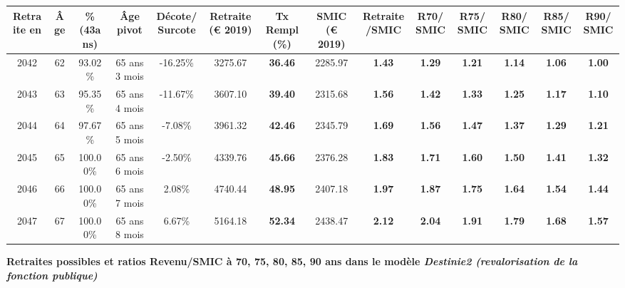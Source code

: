 \begin{adjustbox}{max width=\textwidth} 
\begin{tabular}[htb]{|c|c||c|c|c||c|c||c|c||c|c|c|c|c|} 
\hline 
 Retraite en &  Âge &  \%(43ans) &  Âge pivot &  Décote/Surcote &  Retraite (\euro{} 2019) &  Tx Rempl(\%) &  SMIC (\euro{} 2019) &  Retraite/SMIC &  R70/SMIC &  R75/SMIC &  R80/SMIC &  R85/SMIC &  R90/SMIC \\ 
\hline \hline 
 2042 &  62 &  93.02\% &  65 ans 3 mois &  -16.25\% &  3275.67 &  {\bf 36.46} &  2285.97 &  {\bf 1.43} &  {\bf 1.29} &  {\bf 1.21} &  {\bf 1.14} &  {\bf 1.06} &  {\bf {\color{red} 1.00}} \\ 
\hline 
 2043 &  63 &  95.35\% &  65 ans 4 mois &  -11.67\% &  3607.10 &  {\bf 39.40} &  2315.68 &  {\bf 1.56} &  {\bf 1.42} &  {\bf 1.33} &  {\bf 1.25} &  {\bf 1.17} &  {\bf 1.10} \\ 
\hline 
 2044 &  64 &  97.67\% &  65 ans 5 mois &  -7.08\% &  3961.32 &  {\bf 42.46} &  2345.79 &  {\bf 1.69} &  {\bf 1.56} &  {\bf 1.47} &  {\bf 1.37} &  {\bf 1.29} &  {\bf 1.21} \\ 
\hline 
 2045 &  65 &  100.00\% &  65 ans 6 mois &  -2.50\% &  4339.76 &  {\bf 45.66} &  2376.28 &  {\bf 1.83} &  {\bf 1.71} &  {\bf 1.60} &  {\bf 1.50} &  {\bf 1.41} &  {\bf 1.32} \\ 
\hline 
 2046 &  66 &  100.00\% &  65 ans 7 mois &  2.08\% &  4740.44 &  {\bf 48.95} &  2407.18 &  {\bf 1.97} &  {\bf 1.87} &  {\bf 1.75} &  {\bf 1.64} &  {\bf 1.54} &  {\bf 1.44} \\ 
\hline 
 2047 &  67 &  100.00\% &  65 ans 8 mois &  6.67\% &  5164.18 &  {\bf 52.34} &  2438.47 &  {\bf 2.12} &  {\bf 2.04} &  {\bf 1.91} &  {\bf 1.79} &  {\bf 1.68} &  {\bf 1.57} \\ 
\hline 
\hline 
\end{tabular} 
\end{adjustbox} 
 
 \vspace{0.1cm} 
{\bf \noindent Retraites possibles et ratios Revenu/SMIC à 70, 75, 80, 85, 90 ans dans le modèle \emph{Destinie2 (revalorisation de la fonction publique)}}  
 
